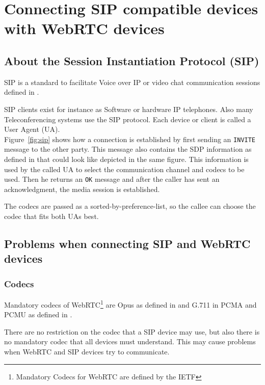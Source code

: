 \documentclass[../../../thesis.tex]{subfiles}
\begin{document}
\clearpage
\section{Connecting SIP compatible devices with WebRTC devices}

\subsection{About the Session Instantiation Protocol (SIP)}
SIP is a standard to facilitate Voice over IP or video chat communication sessions defined in .\par
SIP clients exist for instance as Software or hardware IP telephones. Also many Teleconferencing systems use the SIP protocol. Each device or client is called a User Agent (UA).\\

\noindent
Figure~\ref{fig:sip} shows how a connection is established by first sending an \texttt{INVITE} message to the other party. This message also contains the SDP information as defined in  that could look like depicted in the same figure. This information is used by the called UA to select the communication channel and codecs to be used. Then he returns an \texttt{OK} message and after the caller has sent an acknowledgment, the media session is established.\par
The codecs are passed as a sorted-by-preference-list, so the callee can choose the codec that fits both UAs best.


\subsection{Problems when connecting SIP and WebRTC devices}
\subsubsection{Codecs}
Mandatory codecs of WebRTC\footnote{Mandatory Codecs for WebRTC are defined by the IETF\cite{ietf-rtcweb-audio}} are Opus as defined in  and G.711 in PCMA and PCMU as defined in \cite[section 4.5.14]{rfc3551}.

There are no restriction on the codec that a SIP device may use, but also there is no mandatory codec that all devices must understand. This may cause problems when WebRTC and SIP devices try to communicate.
\end{document}
